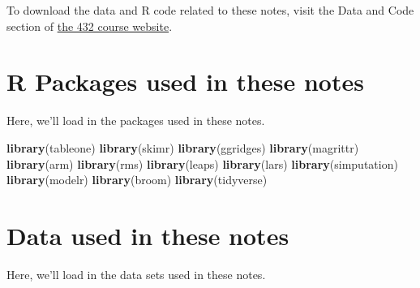 \documentclass[]{book}
\newenvironment{Shaded}{\begin{snugshade}}{\end{snugshade}}
\newcommand{\KeywordTok}[1]{\textcolor[rgb]{0.13,0.29,0.53}{\textbf{#1}}}
\newcommand{\NormalTok}[1]{#1}
\theoremstyle{definition}
\theoremstyle{definition}
\theoremstyle{definition}
\theoremstyle{remark}
\begin{document}
To download the data and R code related to these notes, visit the Data
and Code section of \href{https://github.com/THOMASELOVE/432-2018}{the
432 course website}.

\chapter*{R Packages used in these
notes}\label{r-packages-used-in-these-notes}

Here, we'll load in the packages used in these notes.

\begin{Shaded}
\begin{Highlighting}[]
\KeywordTok{library}\NormalTok{(tableone)}
\KeywordTok{library}\NormalTok{(skimr)}
\KeywordTok{library}\NormalTok{(ggridges)}
\KeywordTok{library}\NormalTok{(magrittr)}
\KeywordTok{library}\NormalTok{(arm)}
\KeywordTok{library}\NormalTok{(rms)}
\KeywordTok{library}\NormalTok{(leaps)}
\KeywordTok{library}\NormalTok{(lars)}
\KeywordTok{library}\NormalTok{(simputation)}
\KeywordTok{library}\NormalTok{(modelr)}
\KeywordTok{library}\NormalTok{(broom)}
\KeywordTok{library}\NormalTok{(tidyverse)}
\end{Highlighting}
\end{Shaded}

\chapter*{Data used in these notes}\label{data-used-in-these-notes}

Here, we'll load in the data sets used in these notes.
\end{document}
